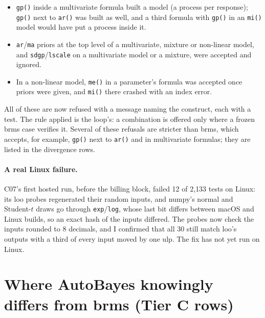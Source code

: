 \documentclass[11pt]{article}
\newcommand{\code}[1]{\texttt{#1}}
\begin{document}
\begin{itemize}
\item \code{gp()} inside a multivariate formula built a model (a process per response); \code{gp()} next to \code{ar()} was
  built as well, and a third formula with \code{gp()} in an \code{mi()} model would have put a process inside it.
\item \code{ar}/\code{ma} priors at the top level of a multivariate, mixture or non-linear model, and \code{sdgp}/\code{lscale}
  on a multivariate model or a mixture, were accepted and ignored.
\item In a non-linear model, \code{me()} in a parameter's formula was accepted once priors were given, and \code{mi()} there
  crashed with an index error.
\end{itemize}

\noindent All of these are now refused with a message naming the construct, each with a test. The rule applied is the
loop's: a combination is offered only where a frozen brms case verifies it. Several of these refusals are stricter
than brms, which accepts, for example, \code{gp()} next to \code{ar()} and in multivariate formulas; they are listed in
the divergence rows.

\paragraph{A real Linux failure.} C07's first hosted run, before the billing block, failed 12 of 2{,}133 tests on Linux:
its loo probes regenerated their random inputs, and numpy's normal and Student-$t$ draws go through \code{exp}/\code{log},
whose last bit differs between macOS and Linux builds, so an exact hash of the inputs differed. The probes now check
the inputs rounded to 8 decimals, and I confirmed that all 30 still match loo's outputs with a third of every input
moved by one ulp. The fix has not yet run on Linux.

\section{Where AutoBayes knowingly differs from brms (Tier C rows)}
\label{sec:divergences}
\end{document}
